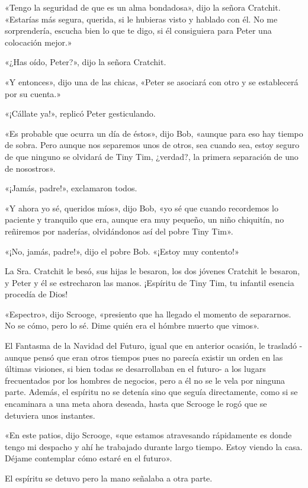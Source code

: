 \documentclass{novela}
\begin{document}
 «Tengo la seguridad de que es un alma bondadosa», dijo la señora Cratchit. «Estarías más segura, querida, si le hubieras visto y hablado con él. No me sorprendería, escucha bien lo que te digo, si él consiguiera para Peter una colocación mejor.»

 «¿Has oído, Peter?», dijo la señora Cratchit.

 «Y entonces», dijo una de las chicas, «Peter se asociará con otro y se establecerá por su cuenta.»

 «¡Cállate ya!», replicó Peter gesticulando.

 «Es probable que ocurra un día de éstos», dijo Bob, «aunque para eso hay tiempo de sobra. Pero aunque nos separemos unos de otros, sea cuando sea, estoy seguro de que ninguno se olvidará de Tiny Tim, ¿verdad?, la primera separación de uno de nosostros».

 «¡Jamás, padre!», exclamaron todos.

 «Y ahora yo sé, queridos míos», dijo Bob, «yo sé que cuando recordemos lo paciente y tranquilo que era, aunque era muy pequeño, un niño chiquitín, no reñiremos por naderías, olvidándonos así del pobre Tiny Tim».

 «¡No, jamás, padre!», dijo el pobre Bob. «¡Estoy muy contento!»

 La Sra. Cratchit le besó, sus hijas le besaron, los dos jóvenes Cratchit le besaron, y Peter y él se estrecharon las manos. ¡Espíritu de Tiny Tim, tu infantil esencia procedía de Dios!

 «Espectro», dijo Scrooge, «presiento que ha llegado el momento de separarnos. No se cómo, pero lo sé. Dime quién era el hómbre muerto que vimos».

 El Fantasma de la Navidad del Futuro, igual que en anterior ocasión, le trasladó -aunque pensó que eran otros tiempos pues no parecía existir un orden en las últimas visiones, si bien todas se desarrollaban en el futuro- a los lugars frecuentados por los hombres de negocios, pero a él no se le vela por ninguna parte. Además, el espíritu no se detenía sino que seguía directamente, como si se encaminara a una meta ahora deseada, hasta que Scrooge le rogó que se detuviera unos instantes.

 «En este patios, dijo Scrooge, «que estamos atravesando rápidamente es donde tengo mi despacho y ahí he trabajado durante largo tiempo. Estoy viendo la casa. Déjame contemplar cómo estaré en el futuro».

 El espíritu se detuvo pero la mano señalaba a otra parte.
\end{document}
